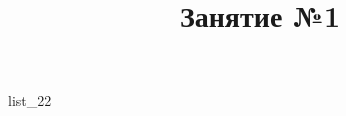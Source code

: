 \documentclass[12pt, a4paper]{article}
\begin{document}
	\title{Занятие №1}
	{list_22}
\end{document}
